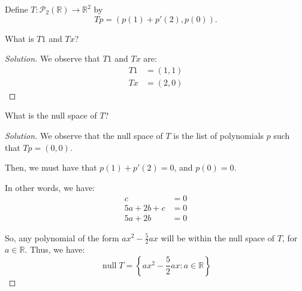 \documentclass[openany]{book}
\newenvironment{solution}{\begin{proof}[Solution]}{\end{proof}}
\newcommand{\RR}{\mathbb{R}}
\DeclareMathOperator*{\vnull}{null}
\begin{document}
\begin{hw}
	Define $T : \mathscr{P}_{2}(\RR) \rightarrow \RR^{2}$ by
	\begin{equation*}
		Tp = (p(1) + p'(2), p(0)).
	\end{equation*}

	What is $T1$ and $Tx$?
\end{hw}
\begin{solution}
	We observe that $T1$ and $Tx$ are:
	\begin{align*}
		T1 &= (1, 1) \\
		Tx &= (2, 0)
	\end{align*}
\end{solution}

\begin{hw}
	What is the null space of $T$?
\end{hw}
\begin{solution}
	We observe that the null space of $T$ is the list of polynomials $p$ such that $Tp = (0,0)$.
	
	Then, we must have that $p(1) + p'(2) = 0$, and $p(0) = 0$.
	
	In other words, we have:
	\begin{align*}
		c &= 0 \\
		5a + 2b + c &= 0 \\
		5a + 2b &= 0
	\end{align*}

	So, any polynomial of the form $ax^{2} - \frac{5}{2}ax$ will be within the null space of $T$, for $a \in \RR$. Thus, we have:
	\begin{equation*}
		\vnull T = \left\{  ax^{2} - \frac{5}{2}ax : a \in \RR \right\}
	\end{equation*}
\end{solution}
\end{document}
